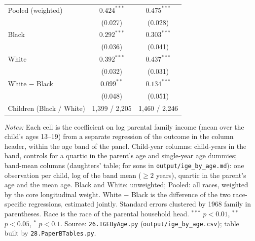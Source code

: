 \begin{table}[!htbp]
{{\begin{tabular}{lcc}
Pooled (weighted) & $0.424^{***}$ & $0.475^{***}$ \\
 & (0.027) & (0.028) \\
Black & $0.292^{***}$ & $0.303^{***}$ \\
 & (0.036) & (0.041) \\
White & $0.392^{***}$ & $0.437^{***}$ \\
 & (0.032) & (0.031) \\
White $-$ Black & $0.099^{**}$ & $0.134^{***}$ \\
 & (0.048) & (0.051) \\
Children (Black / White) & 1,399 / 2,205 & 1,460 / 2,246 \\
\bottomrule
\end{tabular}}}
\par\smallskip
\begin{minipage}{\textwidth}\footnotesize \textit{Notes:} Each cell is the coefficient on log parental family income (mean over the child's ages 13--19) from a separate regression of the outcome in the column header, within the age band of the panel. Child-year columns: child-years in the band, controls for a quartic in the parent's age and single-year age dummies; band-mean columns (daughters' table; for sons in \texttt{output/ige\_by\_age.md}): one observation per child, log of the band mean ($\geq 2$ years), quartic in the parent's age and the mean age. Black and White: unweighted; Pooled: all races, weighted by the core longitudinal weight. White $-$ Black is the difference of the two race-specific regressions, estimated jointly. Standard errors clustered by 1968 family in parentheses. Race is the race of the parental household head. $^{***}$ $p<0.01$, $^{**}$ $p<0.05$, $^{*}$ $p<0.1$. Source: \texttt{26.IGEByAge.py} (\texttt{output/ige\_by\_age.csv}); table built by \texttt{28.PaperBTables.py}.\end{minipage}
\end{table}

